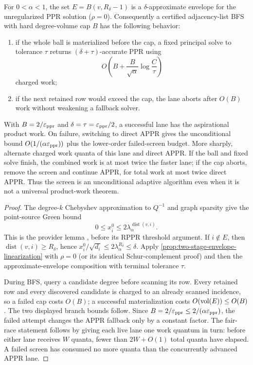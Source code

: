 \begin{theorem}
\label{thm:two-stage-green-ball-screen}
For $0<\alpha<1$, the set
$E=B(v,R_\delta-1)$ is a $\delta$-approximate envelope for the unregularized
PPR solution ($\rho=0$).  Consequently a certified adjacency-list BFS with
hard degree-volume cap $B$ has the following behavior:
\begin{enumerate}[label=(\roman*),leftmargin=2.2em]
\item if the whole ball is materialized before the cap, a fixed principal
  solve to tolerance $\tau$ returns $(\delta+\tau)$-accurate PPR using
  \begin{equation*}
   O\!\left(B+\frac{B}{\sqrt\alpha}
       \log\frac{C}{\tau}\right)
  \end{equation*}
  charged work;
\item if the next retained row would exceed the cap, the lane aborts after
  $O(B)$ work without weakening a fallback solver.
\end{enumerate}
With $B=2/\varepsilon_{\mathrm{ppr}}$ and $\delta=\tau=\varepsilon_{\mathrm{ppr}}/2$, a successful lane has the
aspirational product work.  On failure, switching to direct APPR gives the
unconditional bound $O(1/(\alpha\varepsilon_{\mathrm{ppr}}))$ plus the lower-order failed-screen
budget.  More sharply, alternate charged work quanta of this lane and direct
APPR.  If the ball and fixed solve finish, the combined work is at most twice
the faster lane; if the cap aborts, remove the screen and continue APPR, for
total work at most twice direct APPR.  Thus the screen is an unconditional
adaptive algorithm even when it is not a universal product-work theorem.
\end{theorem}

\begin{proof}
The degree-$k$ Chebyshev approximation to $Q^{-1}$ and graph sparsity give the
point-source Green bound
\begin{equation*}
 0\leq x_i^0\leq2\lambda_\alpha^{\operatorname{dist}(v,i)}.
\end{equation*}
This is the provider lemma , before its RPPR
threshold argument.  If $i\notin E$, then
$\operatorname{dist}(v,i)\geq R_\delta$, hence
$x_i^0/\sqrt{d_i}\leq2\lambda_\alpha^{R_\delta}\leq\delta$.
Apply \cref{prop:two-stage-envelope-linearization} with $\rho=0$ (or its
identical Schur-complement proof) and then the approximate-envelope
composition with terminal tolerance $\tau$.

During BFS, query a candidate degree before scanning its row.  Every retained
row and every discovered candidate is charged to an already scanned
incidence, so a failed cap costs $O(B)$; a successful materialization costs
$O(\operatorname{vol}(E))\leq O(B)$.  The two displayed branch bounds follow.  Since
$B=2/\varepsilon_{\mathrm{ppr}}\leq2/(\alpha\varepsilon_{\mathrm{ppr}})$, the failed attempt changes the APPR
fallback only by a constant factor.  The fair-race statement follows by
giving each live lane one work quantum in turn: before either lane receives
$W$ quanta, fewer than $2W+O(1)$ total quanta have elapsed.  A failed screen
has consumed no more quanta than the concurrently advanced APPR lane.
\end{proof}

